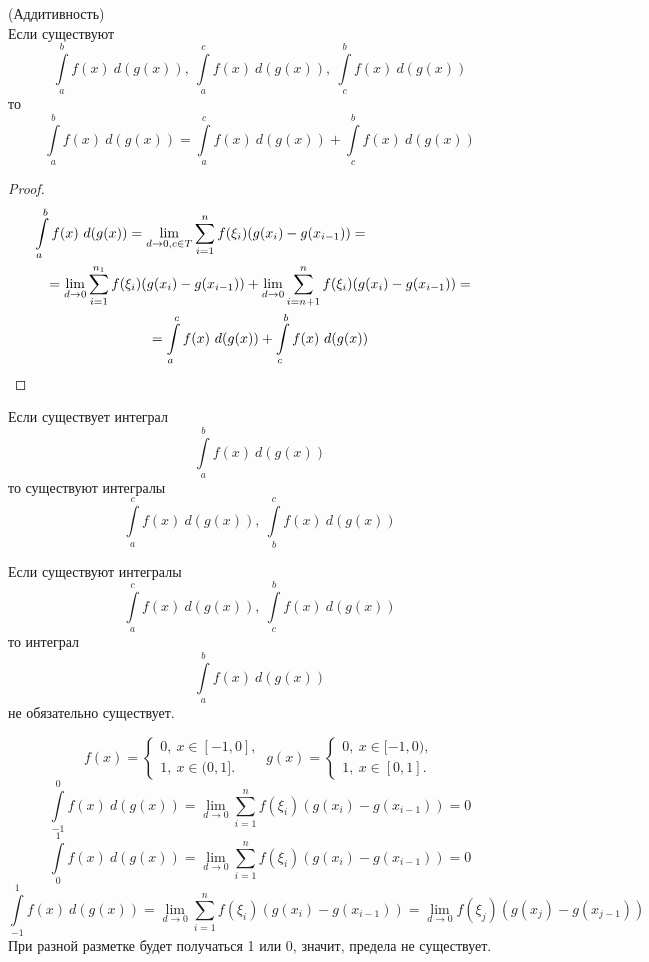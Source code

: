 \begin{numtheorem}
    (Аддитивность)\\
    Если существуют 
    \[\int\limits_{a}^{b}f(x)\ d(g(x)),\ \int\limits_{a}^{c}f(x)\ d(g(x)),\ \int\limits_{c}^{b}f(x)\ d(g(x))\]
    то 
    \[\int\limits_{a}^{b}f(x)\ d(g(x))=\int\limits_{a}^{c}f(x)\ d(g(x)) + \int\limits_{c}^{b}f(x)\ d(g(x))\]
\end{numtheorem} 
\begin{proof}
\begin{multline*}
    \int\limits_{a}^{b}f(x)\ d(g(x))=\lim\limits_{d\to 0, c\in T}\sum\limits_{i=1}^{n}f(\xi_i)(g(x_i)-g(x_{i-1}))=\tab[3cm]\\
    =\lim\limits_{d\to 0}\sum\limits_{i=1}^{n_1}f(\xi_i)(g(x_i)-g(x_{i-1}))+\lim\limits_{d\to 0}\sum\limits_{i=n+1}^{n}f(\xi_i)(g(x_i)-g(x_{i-1}))=\\=\int\limits_{a}^{c}f(x)\ d(g(x)) + \int\limits_{c}^{b}f(x)\ d(g(x))
\end{multline*}
\end{proof} 
\begin{comm}
    Если существует интеграл
    \[\int\limits_{a}^{b}f(x)\ d(g(x))\]
    то существуют интегралы
    \[\int\limits_{a}^{c}f(x)\ d(g(x)),\ \int\limits_{b}^{c}f(x)\ d(g(x))\]
\end{comm} 
\begin{comm}
    Если существуют интегралы
    \[\int\limits_{a}^{c}f(x)\ d(g(x)),\ \int\limits_{c}^{b}f(x)\ d(g(x))\]
    то интеграл
    \[\int\limits_{a}^{b}f(x)\ d(g(x))\]
    не обязательно существует.
\end{comm} 
\begin{example}
    \[f(x)=\begin{cases}
        0,\ x\in [-1,0],\\
        1,\ x\in (0, 1].
    \end{cases}\
        g(x)=\begin{cases}
            0,\ x\in [-1,0),\\
            1,\ x\in [0, 1].
    \end{cases}
    \]
    \[\int\limits_{-1}^{0}f(x)\ d(g(x))=\lim\limits_{d\to 0}\sum\limits_{i=1}^{n}f(\xi_i)(g(x_{i})-g(x_{i-1}))=0\]
    \[\int\limits_{0}^{1}f(x)\ d(g(x))=\lim\limits_{d\to 0}\sum\limits_{i=1}^{n}f(\xi_i)(g(x_{i})-g(x_{i-1}))=0\]
    \[\int\limits_{-1}^{1}f(x)\ d(g(x))=\lim\limits_{d\to 0}\sum\limits_{i=1}^{n}f(\xi_i)(g(x_{i})-g(x_{i-1}))=\lim\limits_{d\to 0} f(\xi_j)(g(x_j)-g(x_{j-1}))\]
    При разной разметке будет получаться 1 или 0, значит, предела не существует.
\end{example}
